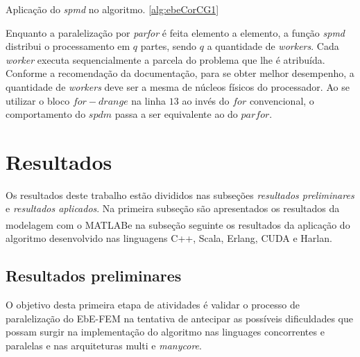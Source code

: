 \documentclass[
    12pt,               %
    openright,          %
    oneside,
    a4paper,            %
    english,            %
    french,             %
    spanish,            %
    brazil              %
    ]{abntex2}
\newcommand{\matlab}{MATLAB\textsuperscript{\textregistered}}
\begin{document}
\begin{algorithm}	
	\caption{\label{alg:ebeSpmdCG1}Aplicação do \textit{spmd} no algoritmo. \ref{alg:ebeCorCG1}} 
	\begin{algorithmic}[1]

		\EndFor
		\EndFor
		\EndFor
	\end{algorithmic}
\end{algorithm}

Enquanto a paralelização por \textit{parfor} é feita elemento a elemento, a função \textit{spmd} distribui o processamento em $q$ partes, sendo $q$ a quantidade de \textit{workers}. Cada \textit{worker} executa sequencialmente a parcela do problema que lhe é atribuída. Conforme a recomendação da documentação, para se obter melhor desempenho, a quantidade de \textit{workers} deve ser a mesma de núcleos físicos do processador. Ao se utilizar o bloco $for-drange$ na linha $13$ ao invés do $for$ convencional, o comportamento do $spdm$ passa a ser equivalente ao do $parfor$.


\section{Resultados}
Os resultados deste trabalho estão divididos nas subseções \textit{resultados preliminares} e \textit{resultados aplicados}. Na primeira subseção são apresentados os resultados da modelagem com o \matlab e na subseção seguinte os resultados da aplicação do algoritmo desenvolvido nas linguagens C++, Scala, Erlang, CUDA e Harlan.

\subsection{Resultados preliminares}
O objetivo desta primeira etapa de atividades é validar o processo de paralelização do EbE-FEM na tentativa de antecipar as possíveis dificuldades que possam surgir na implementação do algoritmo nas linguages concorrentes e paralelas e nas arquiteturas multi e \textit{manycore}. 
\end{document}
